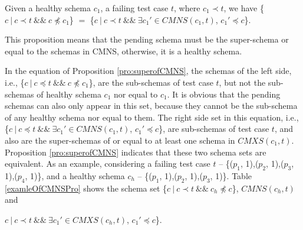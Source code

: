 \begin{proposition}\label{pro:superofCMNS}
Given a healthy schema $c_{1}$, a failing test case $t$, where $c_{1} \prec t$, we have \{$c\ |\ c \prec t\ \&\&\ c \npreceq c_{1}$\} $=$  \{$ c\ |\ c \prec t \  \&\& \ \exists c_{1}' \in CMNS(c_{1}, t)$, $c_{1}' \preceq c$\}.
\end{proposition}

This proposition means that the pending schema must be the super-schema or equal to the schemas in CMNS, otherwise, it is a healthy schema.

In the equation of Proposition \ref{pro:superofCMNS}, the schemas of the left side, i.e., \{$c\ |\ c \preceq t\ \&\&\ c \npreceq c_{1}$\}, are the sub-schemas of test case $t$, but not the sub-schemas of healthy schema $c_{1}$ nor equal to $c_{1}$.  It is obvious that the pending schemas can also only appear in this set, because they cannot be the sub-schema of any healthy schema nor equal to them. The right side set in this equation, i.e.,\{$ c\ |\ c \preceq t \  \&\& \ \exists c_{1}' \in CMNS(c_{1}, t)$, $c_{1}' \preceq c$\}, are sub-schemas of test case $t$, and also are the super-schemas of or equal to at least one schema in $CMXS(c_{1}, t)$. Proposition \ref{pro:superofCMNS} indicates that these two schema sets are equivalent. As an example, considering a failing test case $t$ -- \{($p_{1}$, 1),($p_{2}$, 1),($p_{3}$, 1),($p_{4}$, 1)\}, and a healthy schema $c_{h}$ --  \{($p_{1}$, 1),($p_{2}$, 1),($p_{3}$, 1)\}. Table \ref{examleOfCMNSPro} shows the schema set  \{$c\ |\ c \prec t\ \&\&\ c_{h} \npreceq c$\}, $CMNS(c_{h}, t)$ and {$ c\ |\ c \prec t\ \&\& \ \exists c_{1}' \in CMXS(c_{h}, t)$, $c_{1}' \preceq c$\}.

}
